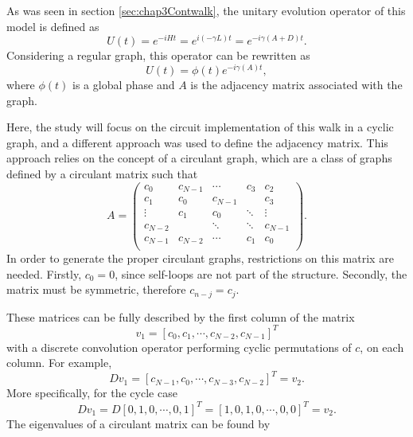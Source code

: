\documentclass[../../dissertation.tex]{subfiles}
\begin{document}
As was seen in section \ref{sec:chap3Contwalk}, the unitary evolution operator of this model is defined as
\begin{equation}
        U(t) = e^{-iHt} = e^{i(-\gamma L)t} = e^{-i\gamma(A+D)t}.
\end{equation}
Considering a regular graph, this operator can be rewritten as 
\begin{equation}
	U(t) = \phi(t) e^{-i\gamma(A)t},
\end{equation}
where $\phi(t)$ is a global phase and $A$ is the adjacency matrix associated with the graph.\par
Here, the study will focus on the circuit implementation of this walk in a cyclic graph, and a different approach was used to define the adjacency matrix. This approach relies on the concept of a circulant graph, which are a class of graphs defined by a circulant matrix such that
\begin{equation}
A = 
	\begin{pmatrix}
		c_0&c_{N-1}& \cdots&c_3&c_2 \\
		c_1&c_0& c_{N-1}& &c_{3} \\
		\vdots & c_1 & c_0 &\ddots & \vdots\\
		c_{N-2}& & \ddots&\ddots &c_{N-1}\\
		c_{N-1} & c_{N-2} & \cdots & c_1 & c_0\\
	\end{pmatrix}.
\label{eq:adjCirculant}
\end{equation}
In order to generate the proper circulant graphs, restrictions on this matrix are needed. Firstly, $c_0=0$, since self-loops are not part of the structure. Secondly, the matrix must be symmetric, therefore $c_{n-j} = c_j$.\par
These matrices can be fully described by the first column of the matrix 
\begin{equation}
	v_1 = [c_{0},c_{1}, \cdots, c_{N-2}, c_{N-1}]^T 
\end{equation}
with a discrete convolution operator performing cyclic permutations of $c$, on each column. For example,
\begin{equation}
	D v_1 = [c_{N-1}, c_{0}, \cdots, c_{N-3}, c_{N-2}]^T = v_2.
\end{equation}
More specifically, for the cycle case
\begin{equation}
	D v_1 = D [0, 1 ,0 , \cdots, 0, 1]^T =[1, 0, 1, 0, \cdots, 0, 0]^T = v_2.
\end{equation}
The eigenvalues of a circulant matrix can be found by
\end{document}
